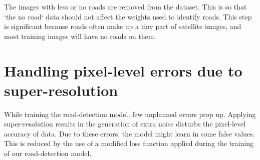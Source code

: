 The images with less or no roads are removed from the dataset. This is so that `the no road` data should not affect the weights used to identify roads. This step is significant because roads often make up a tiny part of satellite images, and most training images will have no roads on them. \par


\section{Handling pixel-level errors due to super-resolution}
While training the road-detection model, few unplanned errors prop up. Applying super-resolution results in the generation of extra noise disturbs the pixel-level accuracy of data. Due to these errors, the model might learn in some false values. This is reduced by the use of a modified loss function applied during the training of our road-detection model.